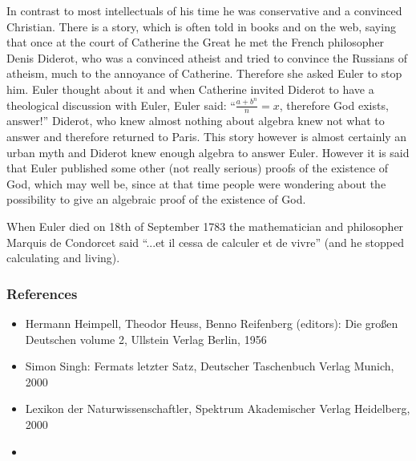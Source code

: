 \documentclass[12pt]{article}
\begin{document}
In contrast to most intellectuals of his time he was conservative and a convinced Christian. There is a story, which is often told in books and on the web, saying that once at the court of Catherine the Great he met the French philosopher Denis Diderot, who was a convinced atheist and tried to convince the Russians of atheism, much to the annoyance of Catherine. Therefore she asked Euler to stop him. Euler thought about it and when Catherine invited Diderot to have a theological discussion with Euler, Euler said: ``$\frac{a+b^n}{n}=x$, therefore God exists, answer!'' Diderot, who knew almost nothing about algebra knew not what to answer and therefore returned to Paris. This story however is almost certainly an urban myth and Diderot knew enough algebra to answer Euler. However it is said that Euler published some other (not really serious) proofs of the existence of God, which may well be, since at that time people were wondering about the possibility to give an algebraic proof of the existence of God.

When Euler died on 18th of September 1783 the mathematician and philosopher Marquis de Condorcet said ``...et il cessa de calculer et de vivre'' (and he stopped calculating and living).
\subsubsection*{References}
\begin{itemize}
\item Hermann Heimpell, Theodor Heuss, Benno Reifenberg (editors): Die gro\ss en Deutschen volume 2, Ullstein Verlag Berlin, 1956
\item Simon Singh: Fermats letzter Satz, Deutscher Taschenbuch Verlag Munich, 2000
\item Lexikon der Naturwissenschaftler, Spektrum Akademischer Verlag Heidelberg, 2000
\item {}\\
\end{itemize}

\end{document}
